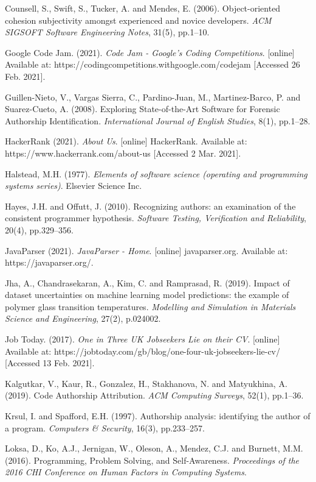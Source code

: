 \documentclass{report}
\begin{document}
Counsell, S., Swift, S., Tucker, A. and Mendes, E. (2006). Object-oriented cohesion subjectivity amongst experienced and novice developers. \textit{ACM SIGSOFT Software Engineering Notes}, 31(5), pp.1–10.

Google Code Jam. (2021). \textit{Code Jam - Google’s Coding Competitions}. [online] Available at: https://codingcompetitions.withgoogle.com/codejam [Accessed 26 Feb. 2021].

Guillen-Nieto, V., Vargas Sierra, C., Pardino-Juan, M., Martinez-Barco, P. and Suarez-Cueto, A. (2008). Exploring State-of-the-Art Software for Forensic Authorship Identification. \textit{International Journal of English Studies}, 8(1), pp.1–28.

HackerRank (2021). \textit{About Us}. [online] HackerRank. Available at: https://www.hackerrank.com/about-us [Accessed 2 Mar. 2021].

Halstead, M.H. (1977). \textit{Elements of software science (operating and programming systems series)}. Elsevier Science Inc.

Hayes, J.H. and Offutt, J. (2010). Recognizing authors: an examination of the consistent programmer hypothesis. \textit{Software Testing, Verification and Reliability}, 20(4), pp.329–356.

JavaParser (2021). \textit{JavaParser - Home}. [online] javaparser.org. Available at: https://javaparser.org/.

Jha, A., Chandrasekaran, A., Kim, C. and Ramprasad, R. (2019). Impact of dataset uncertainties on machine learning model predictions: the example of polymer glass transition temperatures. \textit{Modelling and Simulation in Materials Science and Engineering}, 27(2), p.024002.

Job Today. (2017). \textit{One in Three UK Jobseekers Lie on their CV}. [online] Available at: https://jobtoday.com/gb/blog/one-four-uk-jobseekers-lie-cv/ [Accessed 13 Feb. 2021].

Kalgutkar, V., Kaur, R., Gonzalez, H., Stakhanova, N. and Matyukhina, A. (2019). Code Authorship Attribution. \textit{ACM Computing Surveys}, 52(1), pp.1–36.

Krsul, I. and Spafford, E.H. (1997). Authorship analysis: identifying the author of a program. \textit{Computers \& Security}, 16(3), pp.233–257.

Loksa, D., Ko, A.J., Jernigan, W., Oleson, A., Mendez, C.J. and Burnett, M.M. (2016). Programming, Problem Solving, and Self-Awareness. \textit{Proceedings of the 2016 CHI Conference on Human Factors in Computing Systems}.
\end{document}
